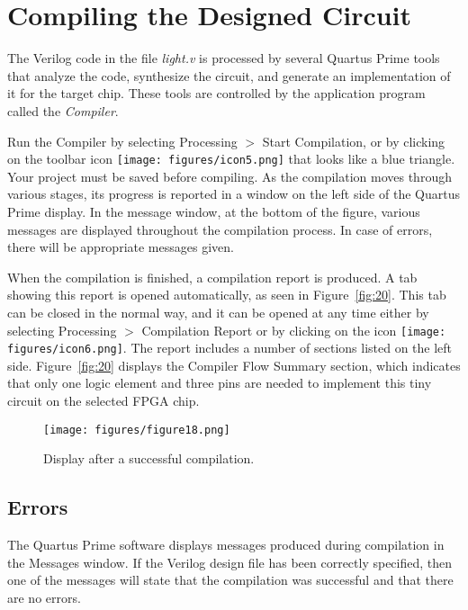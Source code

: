 \section{Compiling the Designed Circuit}


The Verilog code in the file {\it light.v} is processed by several 
Quartus Prime tools that analyze the code, synthesize the circuit,
and generate an implementation of it for the target chip. 
These tools are controlled by the application program called the {\it Compiler}.

Run the Compiler by selecting {\sf Processing $>$ Start Compilation}, or by 
clicking on the toolbar icon \texttt{[image: figures/icon5.png]} that looks like a
blue triangle. Your project must be saved before compiling. 
As the compilation moves through various stages, its progress is reported
in a window on the left side of the Quartus Prime display.
In the message window, at the bottom of the figure, various messages are displayed
throughout the compilation process.
In case of errors, there will be appropriate messages given.

When the compilation is finished, a compilation report is produced.
A tab showing this report is opened automatically, as seen in Figure~\ref{fig:20}.
This tab can be closed in the normal way, and it can be opened at any time
either by selecting {\sf Processing $>$ Compilation Report} or by clicking on 
the icon \texttt{[image: figures/icon6.png]}.
The report includes a number of sections listed on the left side.
Figure~\ref{fig:20} displays the Compiler Flow Summary section, which
indicates that only one logic element and three pins are needed to implement this 
tiny circuit on the selected FPGA chip.

\begin{figure}[H]
   \begin{center}
      \texttt{[image: figures/figure18.png]}
   \caption{Display after a successful compilation.} 
	 \label{fig:18}
	 \end{center}
\end{figure}

\subsection{Errors}

The Quartus Prime software displays messages produced during compilation in the Messages window.
If the Verilog design file has been correctly specified, then one of the messages will
state that the compilation was successful and that there are no errors.

